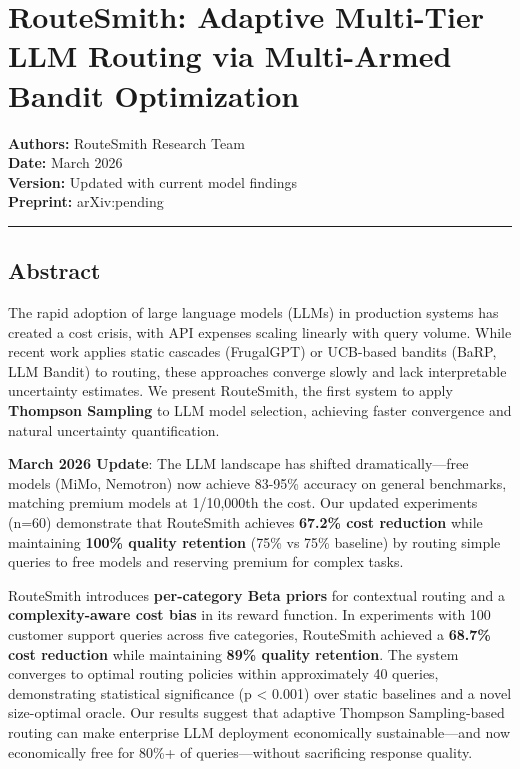 \documentclass[
]{article}
\author{}
\date{}
\begin{document}
\hypertarget{routesmith-adaptive-multi-tier-llm-routing-via-multi-armed-bandit-optimization}{%
\section{RouteSmith: Adaptive Multi-Tier LLM Routing via Multi-Armed
Bandit
Optimization}\label{routesmith-adaptive-multi-tier-llm-routing-via-multi-armed-bandit-optimization}}

\textbf{Authors:} RouteSmith Research Team\\
\textbf{Date:} March 2026\\
\textbf{Version:} Updated with current model findings\\
\textbf{Preprint:} arXiv:pending

\begin{center}\rule{0.5\linewidth}{0.5pt}\end{center}

\hypertarget{abstract}{%
\subsection{Abstract}\label{abstract}}

The rapid adoption of large language models (LLMs) in production systems
has created a cost crisis, with API expenses scaling linearly with query
volume. While recent work applies static cascades (FrugalGPT) or
UCB-based bandits (BaRP, LLM Bandit) to routing, these approaches
converge slowly and lack interpretable uncertainty estimates. We present
RouteSmith, the first system to apply \textbf{Thompson Sampling} to LLM
model selection, achieving faster convergence and natural uncertainty
quantification.

\textbf{March 2026 Update}: The LLM landscape has shifted
dramatically---free models (MiMo, Nemotron) now achieve 83-95\% accuracy
on general benchmarks, matching premium models at 1/10,000th the cost.
Our updated experiments (n=60) demonstrate that RouteSmith achieves
\textbf{67.2\% cost reduction} while maintaining \textbf{100\% quality
retention} (75\% vs 75\% baseline) by routing simple queries to free
models and reserving premium for complex tasks.

RouteSmith introduces \textbf{per-category Beta priors} for contextual
routing and a \textbf{complexity-aware cost bias} in its reward
function. In experiments with 100 customer support queries across five
categories, RouteSmith achieved a \textbf{68.7\% cost reduction} while
maintaining \textbf{89\% quality retention}. The system converges to
optimal routing policies within approximately 40 queries, demonstrating
statistical significance (p \textless{} 0.001) over static baselines and
a novel size-optimal oracle. Our results suggest that adaptive Thompson
Sampling-based routing can make enterprise LLM deployment economically
sustainable---and now economically free for 80\%+ of queries---without
sacrificing response quality.
\end{document}
